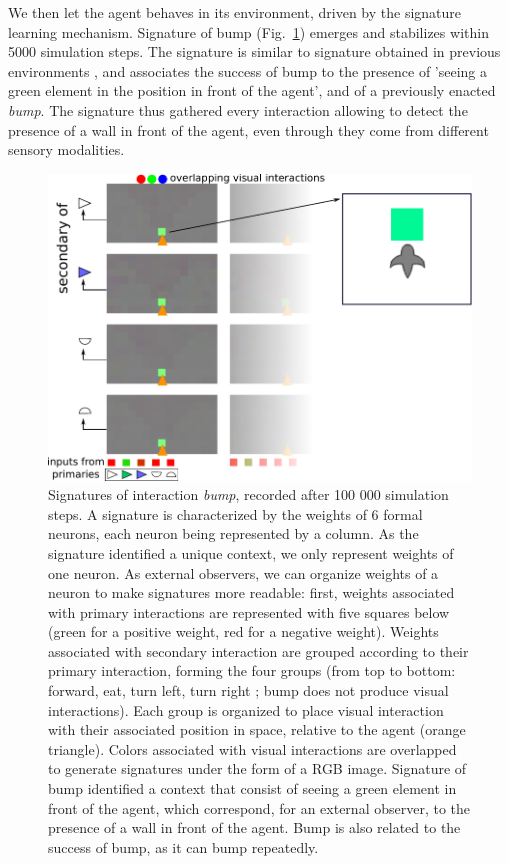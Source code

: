 \documentclass[conference]{IEEEtran}
\makeatletter
\let\cite\relax
\DeclareRobustCommand{\cite}{%
	\let\new@cite@pre\@gobble
	\@ifnextchar[\new@cite{\@citex[]}}
\def\new@cite[#1]{\@ifnextchar[{\new@citea{#1}}{\@citex[#1]}}
\def\new@citea#1{\def\new@cite@pre{#1}\@citex}
\makeatother
\begin{document}
We then let the agent behaves in its environment, driven by the signature learning mechanism. Signature of bump (Fig.~\ref{fig:bump}) emerges and stabilizes within 5000 simulation steps. The signature is similar to signature obtained in previous environments \cite{gay:space}\cite{gay:dynamic}, and associates the success of bump to the presence of 'seeing a green element in the position in front of the agent', and of a previously enacted \textit{bump}. The signature thus gathered every interaction allowing to detect the presence of a wall in front of the agent, even through they come from different sensory modalities.

\begin{figure}[ht]
\centerline{\includegraphics[scale=0.35]{img/Signatures1_5.pdf}}
\caption{Signatures of interaction \textit{bump}, recorded after 100 000 simulation steps. A signature is characterized by the weights of 6 formal neurons, each neuron being represented by a column. As the signature identified a unique context, we only represent weights of one neuron. As external observers, we can organize weights of a neuron to make signatures more readable: first, weights associated with primary interactions are represented with five squares below (green for a positive weight, red for a negative weight). Weights associated with secondary interaction are grouped according to their primary interaction, forming the four groups (from top to bottom: forward, eat, turn left, turn right ; bump does not produce visual interactions). Each group is organized to place visual interaction with their associated position in space, relative to the agent (orange triangle). Colors associated with visual interactions are overlapped to generate signatures under the form of a RGB image. Signature of bump identified a context that consist of seeing a green element in front of the agent, which correspond, for an external observer, to the presence of a wall in front of the agent. Bump is also related to the success of bump, as it can bump repeatedly.
}
\label{fig:bump}
\end{figure}
\end{document}
